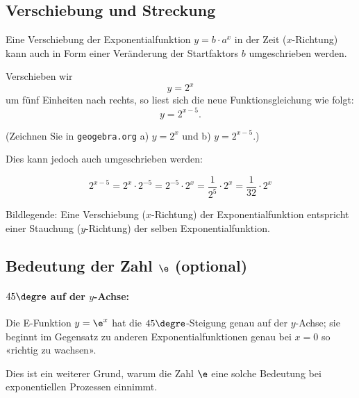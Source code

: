\subsection{Verschiebung und Streckung }

Eine Verschiebung der Exponentialfunktion $y=b\cdot{}a^x$ in der Zeit ($x$-Richtung) kann auch in Form einer Veränderung der Startfaktors $b$ umgeschrieben werden.

Verschieben wir \zB $$y=2^x$$ um fünf Einheiten nach rechts, so liest sich die neue Funktionsgleichung wie folgt:
$$y=2^{x-5}.$$

(Zeichnen Sie in \texttt{geogebra.org} a) $y=2^x$ und b) $y=2^{x-5}$.)

Dies kann jedoch auch umgeschrieben werden:

$$2^{x-5} = 2^x \cdot{} 2^{-5} = 2^{-5} \cdot{} 2^x = \frac{1}{2^5} \cdot{} 2^x =
\frac{1}{32}\cdot{}2^x$$

Bildlegende: Eine Verschiebung ($x$-Richtung) der Exponentialfunktion entspricht einer Stauchung ($y$-Richtung) der selben Exponentialfunktion.


\newpage

\subsection{Bedeutung der Zahl $\e$ (optional)}

\paragraph{$45\degre$ auf der $y$-Achse:}
Die E-Funktion $y=\e^x$ hat die $45\degre$-Steigung genau auf der $y$-Achse; sie beginnt im Gegensatz zu anderen Exponentialfunktionen genau bei $x=0$ so «richtig zu wachsen».


Dies ist ein weiterer Grund, warum die Zahl $\e$ eine solche Bedeutung bei
exponentiellen Prozessen einnimmt.



